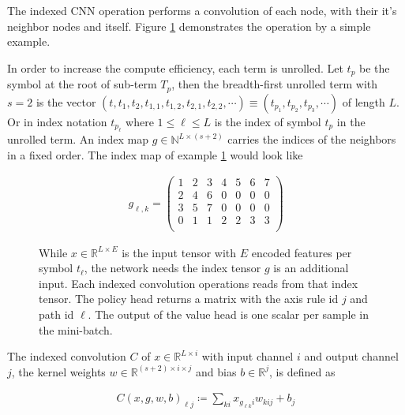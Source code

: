 \documentclass{scrartcl}
\theoremstyle{definition}
\begin{document}
The indexed CNN operation performs a convolution of each node, with their it's neighbor nodes and itself.
Figure \ref{fig:index_tensor} demonstrates the operation by a simple example.

\begin{figure}[!htbp]
	\centering
	
	\label{fig:index_tensor}
\end{figure}

In order to increase the compute efficiency, each term is unrolled.
Let $t_p$ be the symbol at the root of sub-term $T_p$,
then the breadth-first unrolled term with $s=2$ is the vector $\left( t, t_1, t_2, t_{1,1},t_{1,2}, t_{2,1}, t_{2,2}, \cdots \right) \equiv  \left( t_{p_1}, t_{p_2}, t_{p_3},\cdots \right)$ of length $L$.
Or in index notation $t_{p_\ell}$ where $1 \leq \ell \leq L$ is the index of symbol $t_p$ in the unrolled term.
An index map $g \in \mathbb{N}^{L\times \left( s+2 \right)}$ carries the indices of the neighbors in a fixed order.
The index map of example \ref{fig:index_tensor} would look like

\begin{align}
	g_{\ell,k} = 
	\begin{pmatrix}
		1 & 2 & 3 & 4 & 5 & 6 & 7 \\
		2 & 4 & 6 & 0 & 0 & 0 & 0 \\
		3 & 5 & 7 & 0 & 0 & 0 & 0 \\
		0 & 1 & 1 & 2 & 2 & 3 & 3 \\
	\end{pmatrix}
\end{align}


\begin{figure}[!htbp]
	\centering
	
	\caption{While $x\in \mathbb{R}^{L\times E}$ is the input tensor with $E$ encoded features per symbol $t_\ell$, the network needs the index tensor $g$ is an additional input.
		Each indexed convolution operations reads from that index tensor.
		The policy head returns a matrix with the axis rule id $j$ and path id $\ell$. 
		The output of the value head is one scalar per sample in the mini-batch. 
	}
	\label{fig:iconv_network}
\end{figure}

The indexed convolution $C$ of $x \in \mathbb{R}^{L\times i}$ with input channel $i$ and output channel $j$, the kernel weights $w \in \mathbb{R}^{\left( s+2 \right)\times i \times j}$ and bias $b \in \mathbb{R}^j$,
is defined as

\begin{align}
	C\left( x, g, w, b \right)_{\ell j} \coloneqq \sum_{ki}x_{g_{\ell k}i} w_{kij}+b_j
\end{align}
\end{document}
